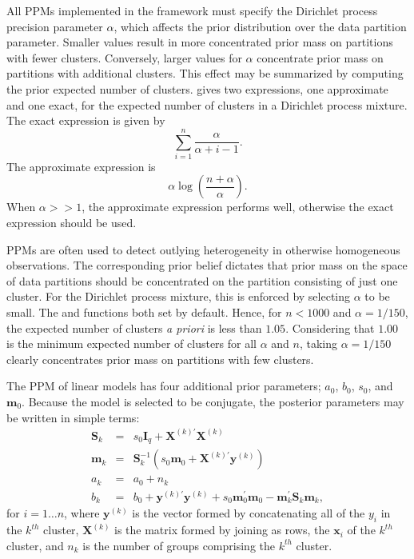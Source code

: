 \documentclass[article, nojss]{jss}
\newcommand{\bx}{\boldsymbol{x}}
\newcommand{\bX}{\boldsymbol{X}}
\newcommand{\bI}{\boldsymbol{I}}
\newcommand{\by}{\boldsymbol{y}}
\newcommand{\bm}{\boldsymbol{m}}
\newcommand{\bS}{\boldsymbol{S}}
\begin{document}
All PPMs implemented in the  framework must specify the Dirichlet process precision parameter $\alpha$, which affects the prior distribution over the data partition parameter. Smaller values result in more concentrated prior mass on partitions with fewer clusters. Conversely, larger values for $\alpha$ concentrate prior mass on partitions with additional clusters. This effect may be summarized by computing the prior expected number of clusters. \citet{Antoniak1974} gives two expressions, one approximate and one exact, for the expected number of clusters in a Dirichlet process mixture. The exact expression is given by \[\sum_{i = 1}^n \frac{\alpha}{\alpha + i - 1}.\] The approximate expression is \[\alpha \log\left(\frac{n + \alpha}{\alpha}\right).\] When $\alpha >> 1$, the approximate expression performs well, otherwise the exact expression should be used.

PPMs are often used to detect outlying heterogeneity in otherwise homogeneous observations. The corresponding prior belief dictates that prior mass on the space of data partitions should be concentrated on the partition consisting of just one cluster. For the Dirichlet process mixture, this is enforced by selecting $\alpha$ to be small. The  and  functions both set  by default. Hence, for $n < 1000$ and $\alpha = 1/150$, the expected number of clusters {\it a priori} is less than $1.05$. Considering that $1.00$ is the minimum expected number of clusters for all $\alpha$ and $n$, taking $\alpha = 1/150$ clearly concentrates prior mass on partitions with few clusters.

The PPM of linear models has four additional prior parameters; $a_0$, $b_0$, $s_0$, and $\bm_0$. Because the model is selected to be conjugate, the posterior parameters may be written in simple terms:
\begin{eqnarray}
\bS_k & = & s_0 \bI_{q} + \bX^{(k)\prime} \bX^{(k)} \nonumber \\
\bm_k & = & \bS_k^{-1}(s_0 \bm_0 + \bX^{(k)\prime} \by^{(k)}) \nonumber \\
a_k  & = & a_0 + n_k \nonumber \\
b_k  & = & b_0 + \by^{(k)\prime}\by^{(k)} + s_0\bm_0^{\prime}\bm_0 - \bm_k^{\prime}\bS_k\bm_k, \label{posterior_stats}
\end{eqnarray}
for $i=1\ldots n$, where $\by^{(k)}$ is the vector formed by concatenating all of the $y_{i}$ in the $k^{th}$ cluster, $\bX^{(k)}$ is the matrix formed by joining as rows, the $\bx_{i}$ of the $k^{th}$ cluster, and $n_k$ is the number of groups comprising the $k^{th}$ cluster.
\end{document}
